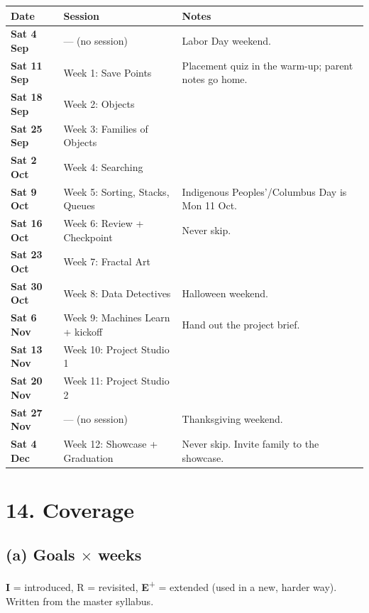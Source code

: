 \documentclass[level=3,teacher]{kidscode}
\begin{document}
\begin{longtable}{@{}>{\bfseries}p{2.3cm}>{\raggedright\arraybackslash}p{5.4cm}>{\raggedright\arraybackslash}p{\dimexpr\linewidth-7.7cm-4\tabcolsep}@{}}
\toprule
\rowcolor{kcaccent!15} Date & Session & Notes\\ \midrule\endhead
\bottomrule\endfoot
Sat 4 Sep & --- (no session) & Labor Day weekend.\\
Sat 11 Sep & Week 1: Save Points & Placement quiz in the warm-up; parent notes go home.\\
Sat 18 Sep & Week 2: Objects &\\
Sat 25 Sep & Week 3: Families of Objects &\\
Sat 2 Oct & Week 4: Searching &\\
Sat 9 Oct & Week 5: Sorting, Stacks, Queues & Indigenous Peoples'/Columbus Day is Mon 11 Oct.\\
Sat 16 Oct & Week 6: Review + Checkpoint & Never skip.\\
Sat 23 Oct & Week 7: Fractal Art &\\
Sat 30 Oct & Week 8: Data Detectives & Halloween weekend.\\
Sat 6 Nov & Week 9: Machines Learn + kickoff & Hand out the project brief.\\
Sat 13 Nov & Week 10: Project Studio 1 &\\
Sat 20 Nov & Week 11: Project Studio 2 &\\
Sat 27 Nov & --- (no session) & Thanksgiving weekend.\\
Sat 4 Dec & Week 12: Showcase + Graduation & Never skip. Invite family to the showcase.\\
\end{longtable}

\section{14. Coverage}

\subsection{(a) Goals $\times$ weeks}
\textbf{I} = introduced, R = revisited, \textbf{E}\textsuperscript{+} = extended (used in a new,
harder way). Written from the master syllabus.
\end{document}
